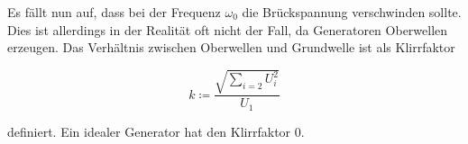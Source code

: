 Es fällt nun auf, dass bei der Frequenz $\omega_0$ die Brückspannung verschwinden sollte.
Dies ist allerdings in der Realität oft nicht der Fall, da Generatoren Oberwellen erzeugen.
Das Verhältnis zwischen Oberwellen und Grundwelle ist als Klirrfaktor

\begin{equation}
    k \coloneq \frac{\sqrt{\sum_{i=2} U_i^2}}{U_1}
    \label{eqn:wien_klirr}
\end{equation}

definiert. Ein idealer Generator hat den Klirrfaktor 0.